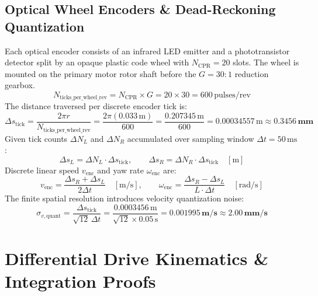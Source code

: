 \documentclass[11pt, a4paper]{article}
\begin{document}
\subsection{Optical Wheel Encoders \& Dead-Reckoning Quantization}
Each optical encoder consists of an infrared LED emitter and a phototransistor detector split by an opaque plastic code wheel with $N_{\text{CPR}} = 20$ slots. The wheel is mounted on the primary motor rotor shaft before the $G = 30:1$ reduction gearbox.
\begin{equation}
    N_{\text{ticks\_per\_wheel\_rev}} = N_{\text{CPR}} \times G = 20 \times 30 = 600\,\text{pulses/rev}
\end{equation}
The distance traversed per discrete encoder tick is:
\begin{equation}
    \Delta s_{\text{tick}} = \frac{2 \pi r}{N_{\text{ticks\_per\_wheel\_rev}}} = \frac{2 \pi (0.033\,\text{m})}{600} = \frac{0.207345\,\text{m}}{600} = 0.00034557\,\text{m} \approx \mathbf{0.3456\,\text{mm}}
\end{equation}
Given tick counts $\Delta N_L$ and $\Delta N_R$ accumulated over sampling window $\Delta t = 50\,\text{ms}$:
\begin{equation}
    \Delta s_L = \Delta N_L \cdot \Delta s_{\text{tick}}, \qquad \Delta s_R = \Delta N_R \cdot \Delta s_{\text{tick}} \quad [\text{m}]
\end{equation}
Discrete linear speed $v_{\text{enc}}$ and yaw rate $\omega_{\text{enc}}$ are:
\begin{equation}
    v_{\text{enc}} = \frac{\Delta s_R + \Delta s_L}{2 \Delta t} \quad [\text{m/s}], \qquad \omega_{\text{enc}} = \frac{\Delta s_R - \Delta s_L}{L \cdot \Delta t} \quad [\text{rad/s}]
\end{equation}
The finite spatial resolution introduces velocity quantization noise:
\begin{equation}
    \sigma_{v, \text{quant}} = \frac{\Delta s_{\text{tick}}}{\sqrt{12} \, \Delta t} = \frac{0.0003456\,\text{m}}{\sqrt{12} \times 0.05\,\text{s}} = \mathbf{0.001995\,\text{m/s}} \approx \mathbf{2.00\,\text{mm/s}}
\end{equation}

\newpage
\section{Differential Drive Kinematics \& Integration Proofs}
\end{document}
